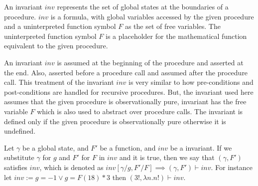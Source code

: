 \documentclass{llncs}
\newcommand{\inv}{\mathit{inv}}
\newcommand{\F}{\mathit{F}}
\newcommand{\gstate}{\gamma}
\newcommand{\satisfies}{\vdash}
\begin{document}
\begin{definition}[invariant]
  An invariant $\inv$ represents the set of global states at the
  boundaries of a procedure. $\inv$ is a formula, with 
  global variables accessed by the given procedure and a uninterpreted
  function symbol $\F$ as the set of free variables.
  The uninterpreted function symbol $\F$ is a placeholder for the
  mathematical function equivalent to the given procedure.
  

  
  
  
\end{definition}

An invariant $\inv$ is assumed at the beginning of the procedure and
asserted at the end. Also, asserted before a procedure call and
assumed after the procedure call. This treatment of the invariant
$\inv$ is very similar to how pre-conditions and post-conditions are
handled for recursive procedures. But, the invariant used here assumes
that the given procedure is observationally pure, invariant has the
free variable $\F$ which is also used to abstract over procedure
calls. The invariant is defined only if the given procedure is
observationally pure otherwise it is undefined.

Let $\gstate$ be a global state, and $\F'$ be a function, and $\inv$
be a invariant. If we substitute $\gstate$ for $g$ and $\F'$ for $\F$
in $\inv$ and it is true, then we say that $(\gstate, \F')$ satisfies
$\inv$, which is denoted as $\inv[\gstate/g, \F'/\F] \implies
(\gstate, \F') \satisfies \inv$. For instance let $\inv := g = -1 \vee
g = \F(18) * 3$ then $(3!, \lambda n. n!) \satisfies \inv$.
\end{document}
